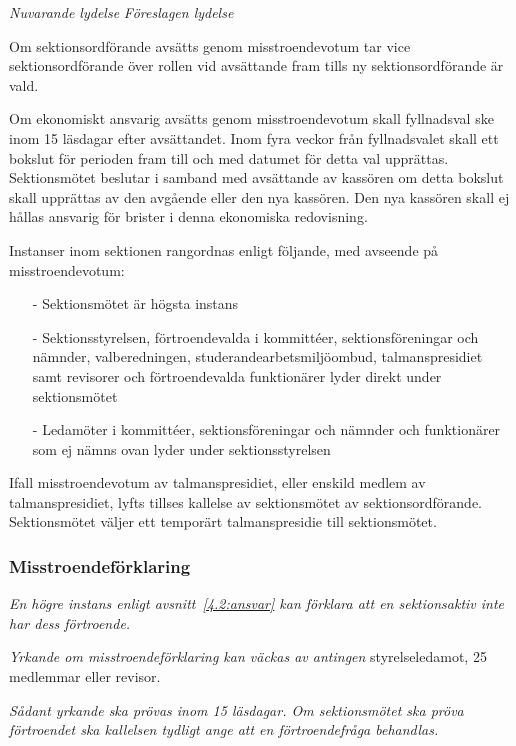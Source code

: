 \documentclass{article}
\newenvironment{lydelse}
    {\begin{paracol}{2}%
        \emph{Nuvarande lydelse}%
        \switchcolumn%
        \emph{Föreslagen lydelse}%
    \end{paracol}%
    \begin{enumerate}[label=\thesubsection.\arabic*]%
    \begin{paracol}{2}%
    }{\end{paracol}\end{enumerate}}
\begin{document}
\begin{lydelse}
  	\item Om sektionsordförande avsätts genom misstroendevotum tar vice sektionsordförande över rollen vid avsättande fram tills ny sektionsordförande är vald.

  	\item Om ekonomiskt ansvarig avsätts genom misstroendevotum skall fyllnadsval ske inom 15 läsdagar efter avsättandet. Inom fyra veckor från fyllnadsvalet skall ett bokslut för perioden fram till och med datumet för detta val upprättas. Sektionsmötet beslutar i samband med avsättande av kassören om detta bokslut skall upprättas av den avgående eller den nya kassören. Den nya kassören skall ej hållas  ansvarig för brister i denna ekonomiska redovisning. 

	\item Instanser inom sektionen rangordnas enligt följande, med avseende på misstroendevotum:
  	  \begin{itemize}
  	    \item[-] Sektionsmötet är högsta instans
  		\item[-] Sektionsstyrelsen, förtroendevalda i kommittéer, sektionsföreningar och nämnder, valberedningen, studerandearbetsmiljöombud, talmanspresidiet samt revisorer och förtroendevalda funktionärer lyder direkt under sektionsmötet
  		\item[-] Ledamöter i kommittéer, sektionsföreningar och nämnder och funktionärer som ej nämns ovan lyder under sektionsstyrelsen
  	  \end{itemize}
	
  	\item Ifall misstroendevotum av talmanspresidiet, eller enskild medlem av talmanspresidiet, lyfts tillses kallelse av sektionsmötet av sektionsordförande. Sektionsmötet väljer ett temporärt talmanspresidie till sektionsmötet.

  \switchcolumn
    \subsubsection*{Misstroendeförklaring}
    \item \emph{En högre instans enligt avsnitt~\ref{4.2:ansvar} kan förklara att en sektionsaktiv inte har dess förtroende.}

    \item \emph{Yrkande om misstroendeförklaring kan väckas av antingen} styrelseledamot, 25 medlemmar eller revisor.

    \item \emph{Sådant yrkande ska prövas inom 15 läsdagar.
    Om sektionsmötet ska pröva förtroendet ska kallelsen tydligt ange att en förtroendefråga behandlas.}


\end{lydelse}
\end{document}
